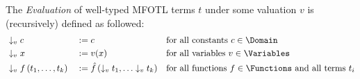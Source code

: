 \begin{definition}
    \label{def:mfotl-evaluation}
    The \emph{Evaluation} of well-typed MFOTL terms $t$ under some valuation $v$ is (recursively) defined as followed:
    \begin{align*}
        &\downarrow_v c
            &&:= c
            && \text{for all constants } c \in \Domain\\
        &\downarrow_v x
            &&:= v(x)
            && \text{for all variables } v \in \Variables\\
        &\downarrow_v f\left(t_1,\dots,t_k\right)
            &&:= \hat{f}\left(\downarrow_v t_1, \dots \downarrow_v t_k \right)
            && \text{for all functions } f \in \Functions \text{ and all terms } t_i \\
    \end{align*}
\end{definition}

